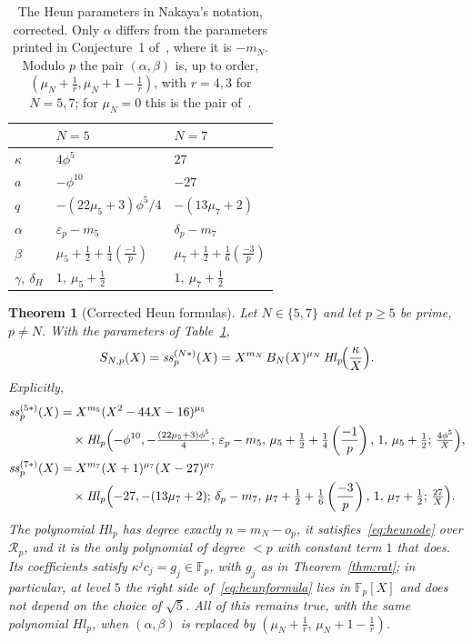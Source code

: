 \documentclass[11pt,a4paper]{article}
\newtheorem{theorem}{Theorem}[section]
\theoremstyle{definition}
\theoremstyle{remark}
\newcommand{\F}{\mathbb{F}}
\newcommand{\leg}[2]{\left(\frac{#1}{#2}\right)}
\newcommand{\Hl}{\mathit{Hl}}
\newcommand{\ssp}{\mathit{ss}_p}
\numberwithin{equation}{section}
\begin{document}
\begin{table}[htbp]
\centering\small\renewcommand{\arraystretch}{1.4}
\begin{tabular}{@{}lll@{}}
\toprule
 & $N=5$ & $N=7$\\
\midrule
$\kappa$ & $4\phi^5$ & $27$\\
$a$ & $-\phi^{10}$ & $-27$\\
$q$ & $-(22\mu_5+3)\phi^5/4$ & $-(13\mu_7+2)$\\
$\alpha$ & $\varepsilon_p-m_5$ & $\delta_p-m_7$\\
$\beta$ & $\mu_5+\tfrac12+\tfrac14\leg{-1}{p}$ & $\mu_7+\tfrac12+\tfrac16\leg{-3}{p}$\\
$\gamma,\ \delta_H$ & $1,\ \mu_5+\tfrac12$ & $1,\ \mu_7+\tfrac12$\\
\bottomrule
\end{tabular}
\caption{The Heun parameters in Nakaya's notation, corrected. Only $\alpha$
differs from the parameters printed in Conjecture~1 of~\cite{Nakaya19}, where
it is $-m_N$. Modulo $p$ the pair $(\alpha,\beta)$ is, up to order,
$(\mu_N+\frac1r,\mu_N+1-\frac1r)$, with $r=4,3$ for $N=5,7$; for $\mu_N=0$ this
is the pair of~\cite[Conjecture~5.2]{Sakai14}.}
\label{tab:heun}
\end{table}

\begin{theorem}[Corrected Heun formulas]\label{thm:main}
Let $N\in\{5,7\}$ and let $p\ge5$ be prime, $p\ne N$. With the parameters of
Table~\ref{tab:heun},
\begin{equation}\label{eq:heunformula}
 S_{N,p}(X)=\ssp^{(N*)}(X)=X^{m_N}\,B_N(X)^{\mu_N}\,\Hl_p\!\Bigl(\frac{\kappa}{X}\Bigr).
\end{equation}
Explicitly,
\begin{align*}
\ssp^{(5*)}(X)&=X^{m_5}(X^2-44X-16)^{\mu_5}\\
&\quad\times\Hl_p\Bigl(-\phi^{10},-\tfrac{(22\mu_5+3)\phi^5}{4};\,
\varepsilon_p-m_5,\,\mu_5+\tfrac12+\tfrac14\leg{-1}{p},\,1,\,\mu_5+\tfrac12;\,
\tfrac{4\phi^5}{X}\Bigr),\\
\ssp^{(7*)}(X)&=X^{m_7}(X+1)^{\mu_7}(X-27)^{\mu_7}\\
&\quad\times\Hl_p\Bigl(-27,-(13\mu_7+2);\,
\delta_p-m_7,\,\mu_7+\tfrac12+\tfrac16\leg{-3}{p},\,1,\,\mu_7+\tfrac12;\,
\tfrac{27}{X}\Bigr).
\end{align*}
The polynomial $\Hl_p$ has degree exactly $n=m_N-o_p$, it
satisfies~\eqref{eq:heunode} over $\mathcal R_p$, and it is the only
polynomial of degree $<p$ with constant term $1$ that does. Its coefficients
satisfy $\kappa^jc_j=g_j\in\F_p$, with $g_j$ as in Theorem~\ref{thm:rat}; in
particular, at level $5$ the right side of~\eqref{eq:heunformula} lies in
$\F_p[X]$ and does not depend on the choice of $\sqrt5$. All of this remains
true, with the same polynomial $\Hl_p$, when $(\alpha,\beta)$ is replaced by
$(\mu_N+\frac1r,\,\mu_N+1-\frac1r)$.
\end{theorem}
\end{document}
